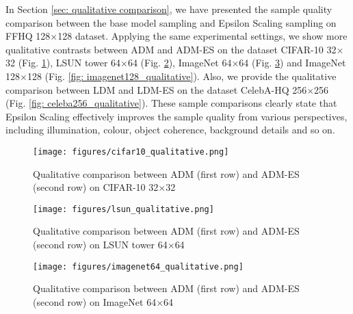 \documentclass{article} \usepackage{iclr2024_conference,times}
\begin{document}
In Section \ref{sec: qualitative comparison}, we have presented the sample quality comparison between the base model sampling and Epsilon Scaling sampling on FFHQ 128$\times$128 dataset. Applying the same experimental settings, we show more qualitative contrasts between ADM and ADM-ES on the dataset CIFAR-10 32$\times$32 (Fig. \ref{fig: cifar10_qualitative}), LSUN tower 64$\times$64 (Fig. \ref{fig: lsun_qualitative}), ImageNet 64$\times$64 (Fig. \ref{fig: imagenet64_qualitative}) and ImageNet 128$\times$128 (Fig. \ref{fig: imagenet128_qualitative}). Also, we provide the qualitative comparison between LDM and LDM-ES on the dataset CelebA-HQ 256$\times$256 (Fig. \ref{fig: celeba256_qualitative}). These sample comparisons clearly state that Epsilon Scaling effectively improves the sample quality from various perspectives, including illumination, colour, object coherence, background details and so on.


\begin{figure}[ht]
\vskip 0.0in
\begin{center}
\centerline{\texttt{[image: figures/cifar10\_qualitative.png]}}
\caption{Qualitative comparison between ADM (first row) and ADM-ES (second row) on CIFAR-10 32$\times$32 
}
\label{fig: cifar10_qualitative}
\end{center}
\vskip -0.2in
\end{figure}



\begin{figure}[ht]
\vskip 0.0in
\begin{center}
\centerline{\texttt{[image: figures/lsun\_qualitative.png]}}
\caption{Qualitative comparison between ADM (first row) and ADM-ES (second row) on LSUN tower 64$\times$64 
}
\label{fig: lsun_qualitative}
\end{center}
\vskip -0.2in
\end{figure}



\begin{figure}[ht]
\vskip 0.0in
\begin{center}
\centerline{\texttt{[image: figures/imagenet64\_qualitative.png]}}
\caption{Qualitative comparison between ADM (first row) and ADM-ES (second row) on ImageNet 64$\times$64 
}
\label{fig: imagenet64_qualitative}
\end{center}
\vskip -0.2in
\end{figure}
\end{document}
